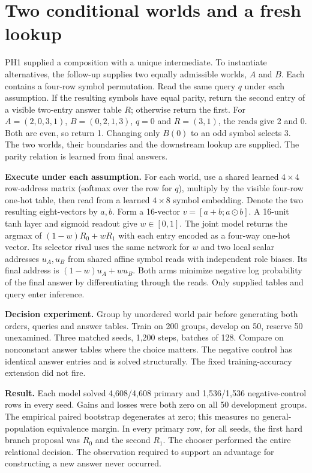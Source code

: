 \section*{Two conditional worlds and a fresh lookup}
PH1 supplied a composition with a unique intermediate. To instantiate alternatives, the follow-up supplies two equally admissible worlds, $A$ and $B$. Each contains a four-row symbol permutation. Read the same query $q$ under each assumption. If the resulting symbols have equal parity, return the second entry of a visible two-entry answer table $R$; otherwise return the first. For $A=(2,0,3,1)$, $B=(0,2,1,3)$, $q=0$ and $R=(3,1)$, the reads give 2 and 0. Both are even, so return 1. Changing only $B(0)$ to an odd symbol selects 3. The two worlds, their boundaries and the downstream lookup are supplied. The parity relation is learned from final answers.
\par
\textbf{Execute under each assumption.} For each world, use a shared learned $4\times4$ row-address matrix (softmax over the row for $q$), multiply by the visible four-row one-hot table, then read from a learned $4\times8$ symbol embedding. Denote the two resulting eight-vectors by $a,b$. Form a 16-vector $v=[a+b;a\odot b]$. A 16-unit tanh layer and sigmoid readout give $w\in[0,1]$. The joint model returns the argmax of $(1-w)R_0+wR_1$ with each entry encoded as a four-way one-hot vector. Its selector rival uses the same network for $w$ and two local scalar addresses $u_A,u_B$ from shared affine symbol reads with independent role biases. Its final address is $(1-w)u_A+wu_B$. Both arms minimize negative log probability of the final answer by differentiating through the reads. Only supplied tables and query enter inference.
\par
\textbf{Decision experiment.} Group by unordered world pair before generating both orders, queries and answer tables. Train on 200 groups, develop on 50, reserve 50 unexamined. Three matched seeds, 1,200 steps, batches of 128. Compare on nonconstant answer tables where the choice matters. The negative control has identical answer entries and is solved structurally. The fixed training-accuracy extension did not fire.
\par
\textbf{Result.} Each model solved 4,608/4,608 primary and 1,536/1,536 negative-control rows in every seed. Gains and losses were both zero on all 50 development groups. The empirical paired bootstrap degenerates at zero; this measures no general-population equivalence margin. In every primary row, for all seeds, the first hard branch proposal was $R_0$ and the second $R_1$. The chooser performed the entire relational decision. The observation required to support an advantage for constructing a new answer never occurred.
